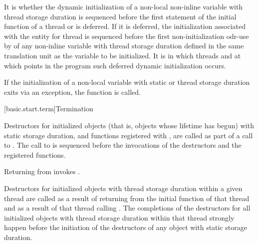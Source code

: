 \pnum
It is 
whether the dynamic initialization of a
non-local non-inline variable with thread storage duration
is sequenced before the first statement of the initial function of a thread or is deferred.
If it is deferred,
the initialization associated with the entity for thread 
is sequenced before the first non-initialization odr-use by 
of any non-inline variable with thread storage duration
defined in the same translation unit as the variable to be initialized.
It is 
in which threads and at which points in the program such deferred dynamic initialization occurs.

\pnum
If the initialization of
a non-local variable with static or thread storage duration
exits via an exception,
the function  is called.%

[basic.start.term]{Termination}

\pnum
{}%
%
%
Destructors for initialized objects
(that is, objects whose lifetime has begun)
with static storage duration,
and functions registered with ,
are called as part of a call to
%
%
.
The call to  is sequenced before
the invocations of the destructors and the registered functions.
\begin{note}
Returning from  invokes .
\end{note}

\pnum
Destructors for initialized objects with thread storage duration within a given thread
are called as a result of returning from the initial function of that thread and as a
result of that thread calling .
The completions of the destructors for all initialized objects with thread storage
duration within that thread strongly happen before the initiation of the destructors of
any object with static storage duration.

